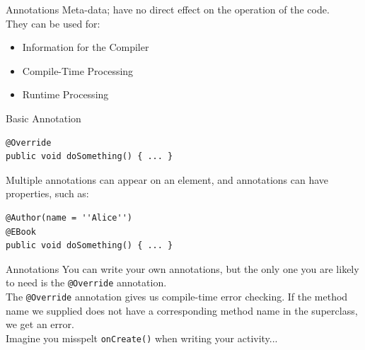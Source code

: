 \documentclass[aspectratio=169]{beamer}
\begin{document}
\begin{frame}{Annotations}
\large
Meta-data; have no direct effect on the operation of the code. \\
\vspace{2em}
They can be used for:
\begin{itemize}
	\item Information for the Compiler
	\item Compile-Time Processing
	\item Runtime Processing
\end{itemize}
\end{frame}



\begin{frame}[fragile]{Basic Annotation}
\begin{verbatim}
@Override
public void doSomething() { ... }
\end{verbatim}

Multiple annotations can appear on an element, and annotations can have properties, such as:

\begin{verbatim}
@Author(name = ''Alice'')
@EBook
public void doSomething() { ... }
\end{verbatim}
\end{frame}



\begin{frame}{Annotations}
\Large
You can write your own annotations, but the only one you are likely to need is the \texttt{@Override} annotation.  \\
\vspace{2em}
The \texttt{@Override} annotation gives us compile-time error checking. If the method name we supplied does not have a corresponding method name in the superclass, we get an error. \\
\vspace{2em}
Imagine you misspelt \texttt{onCreate()} when writing your activity...
\end{frame}
\end{document}
